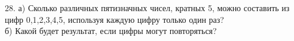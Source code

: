28. а) Сколько различных пятизначных чисел, кратных 5, можно составить из цифр 0,1,2,3,4,5, используя каждую цифру только один раз?\\
б) Какой будет результат, если цифры могут повторяться?\\
